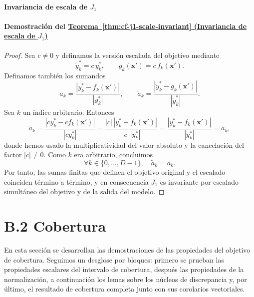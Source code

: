 \documentclass[12pt]{report} %
\begin{document}
\paragraph*{Invariancia de escala de $J_1$}

\paragraph*{Demostración del \hyperref[thm:cf-j1-scale-invariant]{Teorema~\ref*{thm:cf-j1-scale-invariant} (Invariancia de escala de $J_1$)}}
\begin{proof}
    Sea $c \neq 0$ y definamos la versión escalada del objetivo mediante
    $$\tilde{y}_k^* = c\,y_k^*, \qquad g_k(\mathbf{x}') = c\,f_k(\mathbf{x}').$$
    Definamos también los sumandos
    $$a_k = \frac{|y_k^* - f_k(\mathbf{x}')|}{|y_k^*|}, \qquad \tilde{a}_k = \frac{|\tilde{y}_k^* - g_k(\mathbf{x}')|}{|\tilde{y}_k^*|}.$$
    Sea $k$ un índice arbitrario. Entonces
    $$\tilde{a}_k
        = \frac{|c y_k^* - c f_k(\mathbf{x}')|}{|c y_k^*|}
        = \frac{|c|\,|y_k^* - f_k(\mathbf{x}')|}{|c|\,|y_k^*|}
        = \frac{|y_k^* - f_k(\mathbf{x}')|}{|y_k^*|}
        = a_k,$$
    donde hemos usado la multiplicatividad del valor absoluto y la cancelación del factor $|c| \neq 0$. Como $k$ era arbitrario, concluimos
    $$\forall k \in \{0, \ldots, D-1\},\quad \tilde{a}_k = a_k.$$
    Por tanto, las sumas finitas que definen el objetivo original y el escalado coinciden término a término, y en consecuencia $J_1$ es invariante por escalado simultáneo del objetivo y de la salida del modelo.
\end{proof}

\section*{B.2 Cobertura}

En esta sección se desarrollan las demostraciones de las propiedades del objetivo de cobertura. Seguimos un desglose por bloques: primero se prueban las propiedades escalares del intervalo de cobertura, después las propiedades de la normalización, a continuación los lemas sobre los núcleos de discrepancia y, por último, el resultado de cobertura completa junto con sus corolarios vectoriales.
\end{document}
